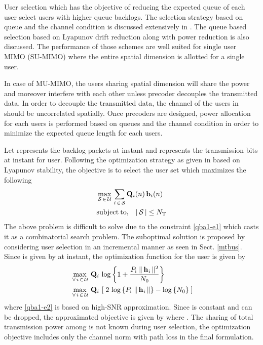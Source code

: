 
User selection which has the objective of reducing the expected queue of each user select users with higher queue backlogs. The selection strategy based on queue and the channel condition is discussed extensively in \cite{neely2012stability}. The queue based selection based on Lyapunov drift reduction along with power reduction is also discussed. The performance of those schemes are well suited for single user MIMO (SU-MIMO) where the entire spatial dimension is allotted for a single user.

In case of MU-MIMO, the users sharing spatial dimension will share the power and moreover interfere with each other unless precoder decouples the transmitted data. In order to decouple the transmitted data, the channel of the users in  should be uncorrelated spatially. Once precoders are designed, power allocation for each users is performed based on queues and the channel condition in order to minimize the expected queue length for each users.

Let  represents the backlog packets at  instant and  represents the transmission bits at  instant for  user. Following the optimization strategy as given in \cite{neely2012stability} based on Lyapunov stability, the objective is to select the user set  which maximizes the following
\begin{eqnarray}
&\displaystyle \max_{\mathcal{S} \, \in \, \mathcal{U}} \, \sum_{i \, \in \, \mathcal{S}}\mathbf{Q}_i(n) \, \mathbf{b}_i(n) \\
&\displaystyle \mathrm{subject \: to,} \quad | \, \mathcal{S} \, | \leq N_{\mathrm{T}}
\label{qba1-e1}
\end{eqnarray}
The above problem is difficult to solve due to the constraint \eqref{qba1-e1} which casts it as a combinatorial search problem. The suboptimal solution is proposed by considering user selection in an incremental manner as seen in Sect. \ref{mtbus}. Since  is given by  at  instant, the optimization function for the user  is given by
\begin{eqnarray}
&\displaystyle \max_{\, \forall \, i \, \in \, \mathcal{U}} \, \mathbf{Q}_i \, \log \left \lbrace 1 + \frac{P_{\mathrm{i}} \; \|\, \mathbf{h}_{\mathit{i}} \,\|^2}{N_{\mathrm{0}}} \right \rbrace \\
&\displaystyle \max_{\, \forall \, i \, \in \, \mathcal{U}} \, \mathbf{Q}_i \, \left [ \; 2 \, \log \left \lbrace P_{\mathrm{i}} \; \|\, \mathbf{h}_{\mathit{i}} \,\| \right \rbrace - \log \left \lbrace N_{\mathrm{0}} \right \rbrace \; \right ]
\label{qba1-e2}
\end{eqnarray}
where \eqref{qba1-e2} is based on high-SNR approximation. Since  is constant and can be dropped, the approximated objective is given by  where . The sharing of total transmission power among  is not known during user selection, the optimization objective includes only the channel norm with path loss in the final formulation.

